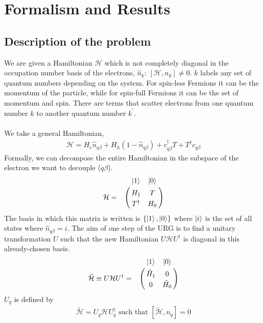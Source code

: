 \documentclass[twoside]{report}
\numberwithin{equation}{section}
\begin{document}
\section{Formalism and Results}
\subsection{Description of the problem}
We are given a Hamiltonian \(\mathcal{H}\) which is not completely diagonal in the occupation number basis of the electrons, \(\hat n_k\): \(\left[\mathcal{H},n_k\right] \neq 0\). \(k\) labels any set of quantum numbers depending on the system. For spin-less Fermions it can be the momentum of the particle, while for spin-full Fermions it can be the set of momentum and spin. There are terms that scatter electrons from one quantum number \(k\) to another quantum number \(k^\prime\).
\\\\We take a general Hamiltonian,
\begin{equation}\begin{aligned}
	\mathcal{H} = H_e \hat n_{q\beta} + H_h \left(1 - \hat n_{q\beta}\right) + c^\dagger_{q\beta}T + T^\dagger c_{q\beta}
\end{aligned}\end{equation}
Formally, we can decompose the entire Hamiltonian in the subspace of the electron we want to decouple (\(q\beta\)).
\begin{equation}\begin{aligned}
	\label{matham}
\mathcal{H} = \bordermatrix{~ & \ket{1} & \ket{0} \cr
              & H_1 & T \cr
              & T^\dagger & H_0 \cr}
\end{aligned}\end{equation}
The basis in which this matrix is written is \(\left\{\ket{1},\ket{0}\right\}\) where \(\ket{i}\) is the set of all states where \(\hat n_{q\beta}=i\). The aim of one step of the URG is to find a unitary transformation \(U\) such that the new Hamiltonian \(U \mathcal{H} U^\dagger\) is diagonal in this already-chosen basis.
\begin{equation}\begin{aligned}
	\tilde{\mathcal{H}} \equiv U \mathcal{H} U^\dagger = \bordermatrix{~ & \ket{1} & \ket{0} \cr
              & \tilde H_1 & 0 \cr
              & 0 & \tilde H_0 \cr}
\end{aligned}\end{equation}
\(U_q\) is defined by
\begin{equation}\begin{aligned}
	\tilde{\mathcal{H}} = U_q \mathcal{H} U^\dagger_q \text{   such that  } \left[\tilde{\mathcal{H}},n_q\right] = 0
\end{aligned}\end{equation}
\end{document}
